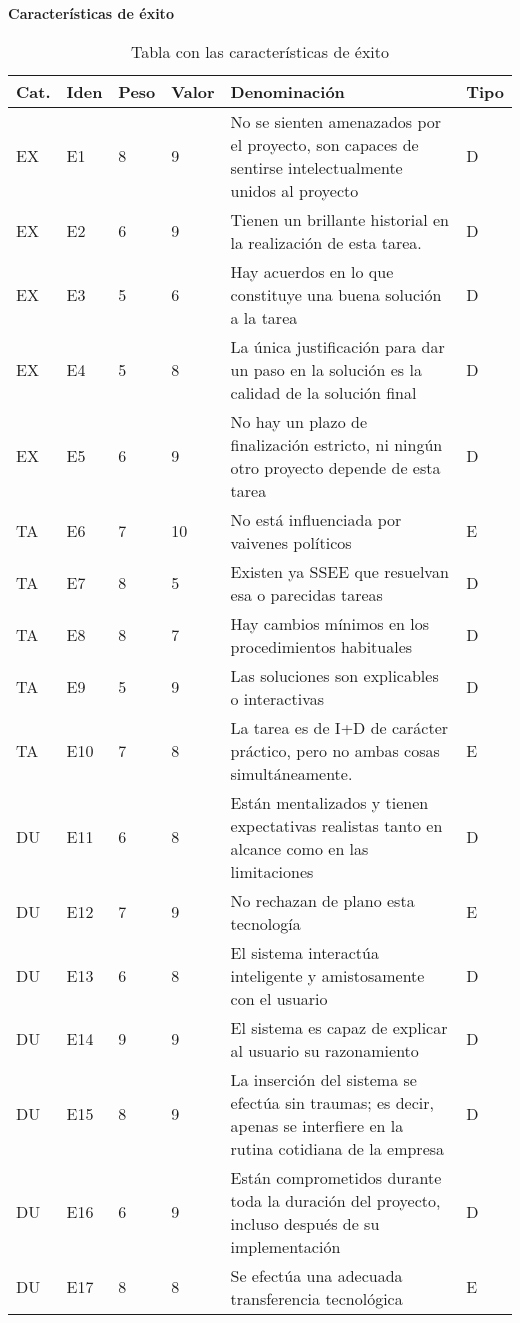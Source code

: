 \textbf{Características de éxito}
\begin{table}[htb]%
  \centering
  \caption{Tabla con las características de éxito}
  \label{tab:anchura}
  \begin{tabular}{ | l | l | l | l | p{8cm} | l | }
    \hline
    Cat. & Iden & Peso & Valor & Denominación & Tipo \\ \hline
    EX & E1 & 8 & 9 & No se sienten amenazados por el proyecto, son capaces de sentirse intelectualmente unidos al proyecto & D \\ \hline
    EX & E2 & 6 & 9 & Tienen un brillante historial en la realización de esta tarea.  & D \\ \hline
    EX & E3 & 5 & 6 & Hay acuerdos en lo que constituye una buena solución a la tarea & D \\ \hline
    EX & E4 & 5 & 8 & La única justificación para dar un paso en la solución es la calidad de la solución final & D \\ \hline
    EX & E5 & 6 & 9 & No hay un plazo de finalización estricto, ni ningún otro proyecto depende de esta tarea & D \\ \hline
    TA & E6 & 7 & 10 & No está influenciada por vaivenes políticos & E \\ \hline
    TA & E7 & 8 & 5 & Existen ya SSEE que resuelvan esa o parecidas tareas & D \\ \hline
    TA & E8 & 8 & 7 & Hay cambios mínimos en los procedimientos habituales & D \\ \hline
    TA & E9 & 5 & 9 & Las soluciones son explicables o interactivas & D \\ \hline
    TA & E10 & 7 & 8 & La tarea es de I+D de carácter práctico, pero no ambas cosas simultáneamente.  & E \\ \hline
    DU & E11 & 6 & 8 & Están mentalizados y tienen expectativas realistas tanto en alcance como en las limitaciones & D \\ \hline
    DU & E12 & 7 & 9 & No rechazan de plano esta tecnología & E \\ \hline
    DU & E13 & 6 & 8 & El sistema interactúa inteligente y amistosamente con el usuario & D \\ \hline
    DU & E14 & 9 & 9 & El sistema es capaz de explicar al usuario su razonamiento & D \\ \hline
    DU & E15 & 8 & 9 & La inserción del sistema se efectúa sin traumas; es decir, apenas se interfiere en la rutina cotidiana de la empresa & D \\ \hline
    DU & E16 & 6 & 9 & Están comprometidos durante toda la duración del proyecto, incluso después de su implementación & D \\ \hline
    DU & E17 & 8 & 8 & Se efectúa una adecuada transferencia tecnológica & E \\ \hline
  \end{tabular}
\end{table}

